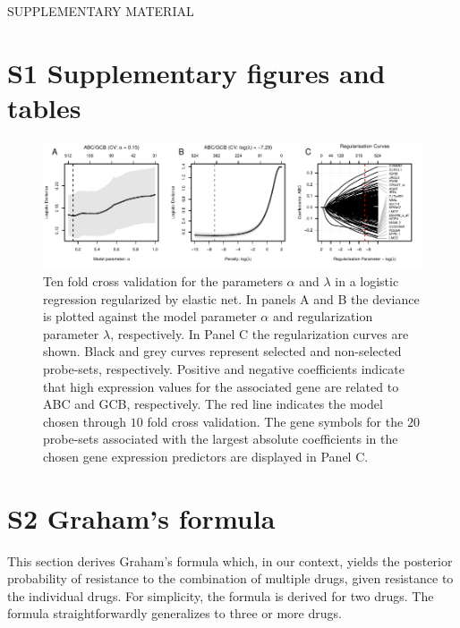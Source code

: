 \documentclass{article}
\begin{document}
{}
\begin{center}
{\huge SUPPLEMENTARY MATERIAL}\bigskip \\
{\bf \hemaClassTitle{}}
\end{center}

\section*{S1 Supplementary figures and tables}

\begin{figure}[htb]
\begin{center}
\includegraphics[width=1\textwidth]{figures/figureS1.pdf}
\end{center}
\caption{Ten fold cross validation for the parameters $\alpha$ and $\lambda$ in a logistic regression regularized by elastic net.
In panels A and B the deviance is plotted against the model parameter $\alpha$ and regularization parameter $\lambda$, respectively.
In Panel C the regularization curves are shown.
Black and grey curves represent selected and non-selected probe-sets, respectively.
Positive and negative coefficients indicate that high expression values for the associated gene are related to ABC and GCB, respectively.
The red line indicates the model chosen through $10$ fold cross validation.
The gene symbols for the $20$ probe-sets associated with the largest absolute coefficients in the chosen gene expression predictors are displayed in Panel C.}
\label{fig:crossval}
\end{figure}







\clearpage



\section*{S2 Graham's formula}
\label{sec:graham}
This section derives Graham's formula which, in our context, yields the posterior probability of resistance to the combination of multiple drugs, given resistance to the individual drugs.
For simplicity, the formula is derived for two drugs.
The formula straightforwardly generalizes to three or more drugs.
\end{document}

